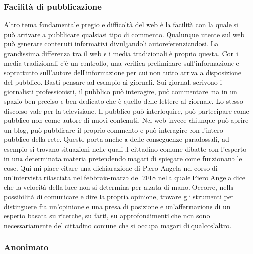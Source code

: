\subsubsection{Facilità di pubblicazione}

Altro tema fondamentale pregio e difficoltà del web è la facilità con la quale si può arrivare a pubblicare qualsiasi tipo di commento. Qualunque utente sul web può generare contenuti informativi divulgandoli autoreferenziandosi. 
La grandissima differenza tra il web e i media tradizionali è proprio questa. Con i media tradizionali c'è un controllo, una verifica preliminare sull'informazione e soprattutto sull'autore dell'informazione per cui non tutto arriva a disposizione del pubblico. Basti pensare ad esempio ai giornali. Sui giornali scrivono i giornalisti professionisti, il pubblico può interagire, può commentare ma in un spazio ben preciso e ben dedicato che è quello delle lettere al giornale. 
Lo stesso discorso vale per la televisione. Il pubblico può interloquire, può partecipare come pubblico non come autore di nuovi contenuti. 
Nel web invece chiunque può aprire un blog, può pubblicare il proprio commento e può interagire con l'intero pubblico della rete.
Questo porta anche a delle conseguenze paradossali, ad esempio si trovano situazioni nelle quali il cittadino comune dibatte con l'esperto in una determinata materia pretendendo magari di spiegare come funzionano le cose. Qui mi piace citare una dichiarazione di Piero Angela nel corso di un'intervista rilasciata nel febbraio-marzo del 2018 nella quale Piero Angela dice che la velocità della luce non si determina per alzata di mano. 
Occorre, nella possibilità di comunicare e dire la propria opinione,  trovare gli strumenti per distinguere fra un'opinione e una presa di posizione e un'affermazione di un esperto basata su ricerche, su fatti, su approfondimenti che non sono necessariamente del cittadino comune che si occupa magari di qualcos'altro. 

\subsubsection{Anonimato}

